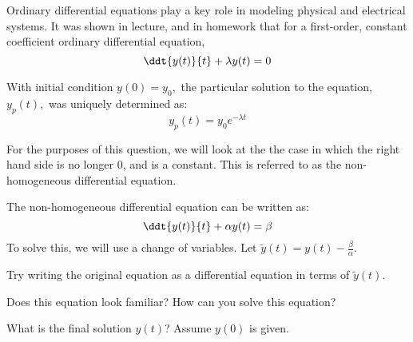 


Ordinary differential equations play a key role in modeling physical and electrical systems.
It was shown in lecture, and in homework that for a first-order, constant coefficient ordinary differential equation,
\begin{equation} \label{eq:h}
\ddt{y(t)}{t} + \lambda y(t) = 0
\end{equation}

With initial condition $y(0) = y_0,$ the particular solution to the equation, $y_p(t),$ was uniquely determined as:
\begin{equation} \label{eq:hs}
y_p(t) = y_0 e^{-\lambda t}
\end{equation}

For the purposes of this question, we will look at the the case in which the right hand side is no longer 0, and is a constant.
This is referred to as the non-homogeneous differential equation.

The non-homogeneous differential equation can be written as:
\begin{equation} \label{eq:nh}
    \ddt{y(t)}{t} + \alpha y(t) = \beta
\end{equation}
To solve this, we will use a change of variables.
Let $\widetilde{y}(t) = y(t) - \frac{\beta}{\alpha}$.

\begin{enumerate}

\qitem Try writing the original equation as a differential 
equation in terms of $\widetilde{y}(t)$.


\qitem Does this equation look familiar? How can you solve this equation?



\qitem What is the final solution $y(t)$? Assume $y(0)$ is given.


\end{enumerate}

